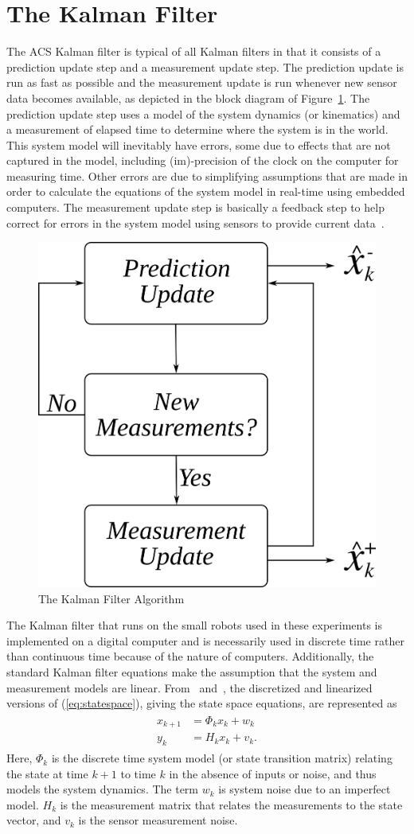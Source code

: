 \section{The Kalman Filter}%
\label{sec:kalmanfilter}
The ACS Kalman filter is typical of all Kalman filters in that it consists of a prediction update step and a measurement update step.
The prediction update is run as fast as possible and the measurement update is run whenever new sensor data becomes available, as depicted in the block diagram of Figure~\ref{fig:kf}.
The prediction update step uses a model of the system dynamics (or kinematics) and a measurement of elapsed time to determine where the system is in the world.
This system model will inevitably have errors, some due to effects that are not captured in the model, including (im)-precision of the clock on the computer for measuring time.
Other errors are due to simplifying assumptions that are made in order to calculate the equations of the system model in real-time using embedded computers.
The measurement update step is basically a feedback step to help correct for errors in the system model using sensors to provide current data~\cite{Kelly_1994_338}.

\begin{figure}[ht!]
\centering
\includegraphics[width=.4\textwidth]{images/kf}
\caption{The Kalman Filter Algorithm}%
\label{fig:kf}
\end{figure}

The Kalman filter that runs on the small robots used in these experiments is implemented on a digital computer and is necessarily used in discrete time rather than continuous time because of the nature of computers.
Additionally, the standard Kalman filter equations make the assumption that the system and measurement models are linear.
From~\cite{Kelly_1994_338} and~\cite{Simon06OptimalEstimation}, the discretized and linearized versions of (\ref{eq:statespace}), giving the state space equations, are represented as
\begin{align*}
\begin{split}
x_{k+1} &= \Phi_k x_k + w_k \\
y_k &= H_k x_k + v_k.
\end{split}
\end{align*}
Here, $\Phi_k$ is the discrete time system model (or state transition matrix) relating the state at time $k+1$ to time $k$ in the absence of inputs or noise, and thus models the system dynamics.
The term $w_k$ is system noise due to an imperfect model.
$H_k$ is the measurement matrix that relates the measurements to the state vector, and $v_k$ is the sensor measurement noise.

